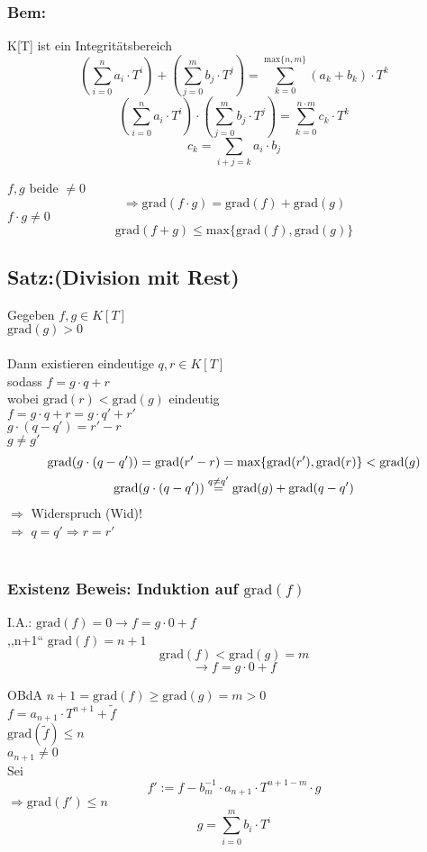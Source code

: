 \documentclass[titlepage,12pt,a4paper,ngerman]{report}
\newcommand{\tx}[1]{\textrm{#1}}
\newcommand{\grad}{\tx{grad}}
\begin{document}
\subsubsection{Bem:} K[T] ist ein Integritätsbereich 
$$(\sum^{n}_{i=0} a_{i}\cdot T^i)+(\sum^{m}_{j=0} b_{j}\cdot T^j) = \sum^{\textrm{max}\{n,m\}}_{k=0} (a_{k}+b_{k})\cdot T^k$$
$$(\sum_{i=0}^{n}a_{i}\cdot T^{i})\cdot (\sum_{j=0}^{m}b_{j}\cdot T^{j}) = \sum_{k=0}^{n\cdot m}c_{k}\cdot T^{k}$$
$$ c_{k}=\sum_{i+j=k}a_{i}\cdot b_{j}$$

\noindent $f,g$ beide $\neq 0$
$$\Rightarrow \grad(f\cdot g) = \grad(f) + \grad(g)$$
$f\cdot g \neq 0$
$$\grad (f + g) \le \textrm{max}\{\grad(f), \grad(g)\}$$
\subsection{Satz:(Division mit Rest)}
Gegeben $f,g \in K[T]$\\
$\grad(g)> 0$ \\\\
Dann existieren eindeutige $q,r\in K[T]$\\
sodass $f=g\cdot q+r$\\
wobei $\grad(r) < \grad(g)$ eindeutig\\
$f = g\cdot q+r = g\cdot q' + r'$\\
$g\cdot(q-q') = r' - r$\\
$g\neq g'$
\begin{gather*}
\grad(g\cdot(q-q')) = \grad( r' - r) = \textrm{max}\{ \grad(r'),\grad(r) \} < \grad(g) \\ \grad(g\cdot(q-q')) \buildrel q\neq q'\over = \grad(g) + \grad(q-q') 
\end{gather*}
$\Rightarrow$ Widerspruch (Wid)!\\
$\Rightarrow$ $q = q' \Rightarrow r = r'$\\\\
\subsubsection{Existenz Beweis: Induktion auf $\grad(f)$}
I.A.: $\grad(f)= 0 \rightarrow f = g\cdot0 + f$\\
,,n+1`` $\grad(f)= n+1$
$$\grad(f) < \grad(g) = m$$
$$\rightarrow f = g\cdot 0 + f$$

OBdA $n+1 = \grad(f)\ge \grad(g) = m > 0$\\
$f = a_{n+1} \cdot  T^ {n+1} + \tilde{f}$\\
$\grad(\tilde{f}) \le n$\\
$ a_{n+1} \neq 0$\\
Sei $$f' := f - b_{m}^{-1}\cdot  a_{n+1} \cdot  T^{n+1-m} \cdot  g$$
$\Rightarrow \grad(f') \le n$
$$ g= \sum_{i=0}^{m} b_{i} \cdot  T^i$$
\end{document}
